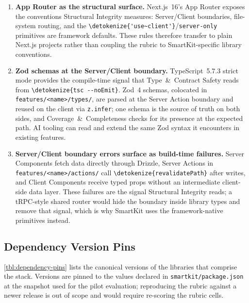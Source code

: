 \documentclass[12pt,a4paper]{report}
\newcommand{\code}[1]{\texttt{\nolinkurl{\detokenize{#1}}}}
\newcommand{\pkg}[1]{\texttt{\nolinkurl{#1}}}
\DeclareRobustCommand{\filename}[1]{\bgroup\urlstyle{tt}\nolinkurl{#1}\egroup}
\newcommand{\usec}{\code{'use~client'}}
\begin{document}
\begin{enumerate}
  \item \textbf{App Router as the structural surface.} Next.js~16's App Router exposes the conventions Structural Integrity measures: Server/Client boundaries, file-system routing, and the \usec/\pkg{server-only} primitives are framework defaults. These rules therefore transfer to plain Next.js projects rather than coupling the rubric to SmartKit-specific library conventions.
  \item \textbf{Zod schemas at the Server/Client boundary.} TypeScript~5.7.3 strict mode provides the compile-time signal that Type~\&~Contract Safety reads from \code{tsc --noEmit}. Zod~4 schemas, colocated in \filename{features/<name>/types/}, are parsed at the Server Action boundary and reused on the client via \pkg{z.infer}; one schema is the source of truth on both sides, and Coverage~\&~Completeness checks for its presence at the expected path. AI tooling can read and extend the same Zod syntax it encounters in existing features.
  \item \textbf{Server/Client boundary errors surface as build-time failures.} Server Components fetch data directly through Drizzle, Server Actions in \filename{features/<name>/actions/} call \code{revalidatePath} after writes, and Client Components receive typed props without an intermediate client-side data layer. These failures are the signal Structural Integrity reads; a tRPC-style shared router would hide the boundary inside library types and remove that signal, which is why SmartKit uses the framework-native primitives instead.
\end{enumerate}

\subsection{Dependency Version Pins}
\label{sec:dependency-pins}

\autoref{tbl:dependency-pins} lists the canonical versions of the libraries that comprise the stack. Versions are pinned to the values declared in \filename{smartkit/package.json} at the snapshot used for the pilot evaluation; reproducing the rubric against a newer release is out of scope and would require re-scoring the rubric cells.
\end{document}
